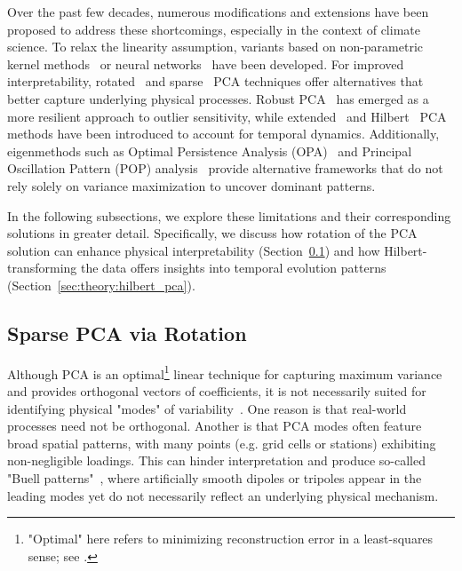 Over the past few decades, numerous modifications and extensions have been proposed to address these shortcomings, especially in the context of climate science. To relax the linearity assumption, variants based on non-parametric kernel methods~\cite{webb_approach_1996,scholkopf_nonlinear_1998,bueso_nonlinear_2020} or neural networks~\cite{kramer_nonlinear_1991} have been developed. For improved interpretability, rotated~\cite{richman_rotation_1986} and sparse~\cite{jolliffe_simplified_2002} PCA techniques offer alternatives that better capture underlying physical processes. Robust PCA~\cite{candes_robust_2011} has emerged as a more resilient approach to outlier sensitivity, while extended~\cite{weare_examples_1982,broomhead_extracting_1986} and Hilbert~\cite{barnett_interaction_1983,horel_complex_1984} PCA methods have been introduced to account for temporal dynamics. Additionally, eigenmethods such as Optimal Persistence Analysis (OPA)~\cite{delsole_optimally_2001,delsole_low-frequency_2006} and Principal Oscillation Pattern (POP) analysis~\cite{hasselmann_pips_1988} provide alternative frameworks that do not rely solely on variance maximization to uncover dominant patterns.

In the following subsections, we explore these limitations and their corresponding solutions in greater detail. Specifically, we discuss how rotation of the PCA solution can enhance physical interpretability (Section~\ref{sec:theory:rotated_pca}) and how Hilbert-transforming the data offers insights into temporal evolution patterns (Section~\ref{sec:theory:hilbert_pca}).






\subsection{Sparse PCA via Rotation}\label{sec:theory:rotated_pca}
Although PCA is an optimal\footnote{"Optimal" here refers to minimizing reconstruction error in a least-squares sense; see \citet{bishop_pattern_2006}.} linear technique for capturing maximum variance and provides orthogonal vectors of coefficients, it is not necessarily suited for identifying physical "modes" of variability~\cite{richman_rotation_1986,legates_effect_1993,jolliffe_principal_2002}. One reason is that real-world processes need not be orthogonal. Another is that PCA modes often feature broad spatial patterns, with many points (e.g. grid cells or stations) exhibiting non-negligible loadings. This can hinder interpretation and produce so-called "Buell patterns"~\cite{buell_physical_1979,richman_rotation_1986,legates_effect_1991}, where artificially smooth dipoles or tripoles appear in the leading modes yet do not necessarily reflect an underlying physical mechanism.

